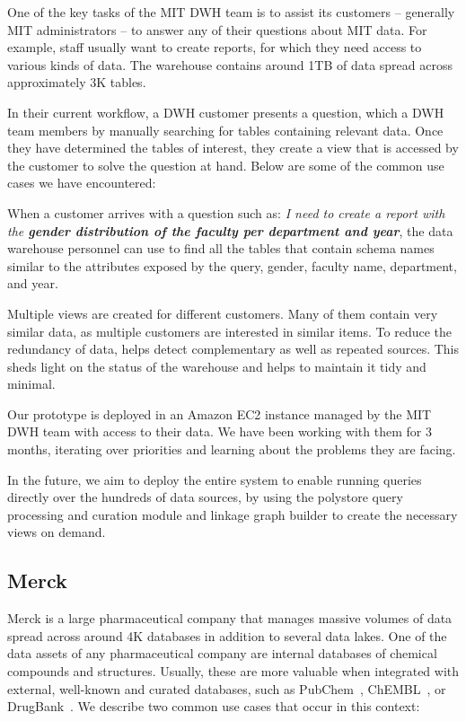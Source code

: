 One of the key tasks of the MIT DWH team is to assist its customers --
generally MIT administrators -- to answer any of their questions about MIT
data. For example, staff usually want to create reports, for which they need
access to various kinds of data. The warehouse contains around 1TB of data
spread across approximately 3K tables.

In their current workflow, a
DWH customer presents a question, which a DWH team
members by manually searching for tables containing relevant data. Once they have determined
the tables of interest, they create a view that is accessed by the customer to
solve the question at hand. Below are some of the common use cases we have
encountered:

 When a customer arrives with a question such as:
\emph{I need to create a report with the \textbf{gender distribution of the
faculty per department and year}}, the data warehouse personnel can use \dcv to
find all the tables that contain schema names similar to the attributes exposed
by the query, \eg gender, faculty name, department, and year.

 Multiple views are created for different customers.
Many of them contain very similar data, as multiple customers are
interested in similar items. To reduce the redundancy of data, \dcv helps
detect complementary as well as repeated sources. This sheds light on the status
of the warehouse and helps to maintain it tidy and minimal.

Our prototype is deployed in an Amazon EC2 instance managed by the MIT DWH team
with access to their data. We have been working with them for 3 months,
iterating over priorities and learning about the problems they are facing.

In the future, we aim to deploy the entire \dcv system to enable running queries
directly over the hundreds of data sources, by using the polystore query
processing and curation module and linkage graph builder to create the necessary
views on demand. 

\subsection{Merck}

Merck is a large pharmaceutical company that manages massive volumes of data spread
across around 4K databases in addition to several data lakes. 
One of the data assets of any pharmaceutical company are internal databases of
chemical compounds and structures. Usually, these are more valuable when
integrated with external, well-known and curated databases, such as
PubChem~\cite{pubchem}, ChEMBL~\cite{ChEMBL}, or DrugBank~\cite{DrugBank}. We
describe two common use cases that occur in this context:

